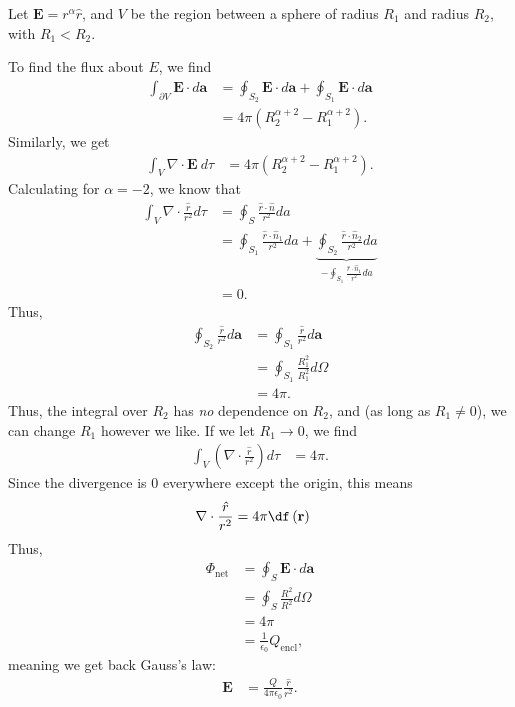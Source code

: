 \documentclass[10pt]{mypackage}
\begin{document}
\begin{example}
  Let $\mathbf{E} = r^{\alpha}\hat{r}$, and $V$ be the region between a sphere of radius $R_1$ and radius $R_2$, with $R_1 < R_2$.\newline

  To find the flux about $E$, we find
  \begin{align*}
    \int_{\partial V}^{} \mathbf{E}\cdot d\mathbf{a} &= \oint_{S_2}\mathbf{E}\cdot d\mathbf{a} + \oint_{S_1} \mathbf{E}\cdot d\mathbf{a}\\
                                            &= 4\pi \left(R_2^{\alpha + 2} - R_{1}^{\alpha + 2}\right).
  \end{align*}
  Similarly, we get
  \begin{align*}
    \int_{V}^{} \nabla \cdot \mathbf{E}\:d\tau &= 4\pi\left(R_2^{\alpha + 2} - R_1^{\alpha + 2}\right).
  \end{align*}
  Calculating for $\alpha = -2$, we know that
  \begin{align*}
    \int_{V}\nabla \cdot \frac{\hat{r}}{r^2}d\tau &= \oint_{S}\frac{\hat{r}\cdot \hat{n}}{r^2}da\\
                                                  &= \oint_{S_1}\frac{\hat{r}\cdot \hat{n}_1}{r^2}da + \underbrace{\oint_{S_2}\frac{\hat{r}\cdot \hat{n}_2}{r^2}da}_{-\oint_{S_1}\frac{\hat{r}\cdot \hat{n}_1}{r^2}da}\\
                                                  &= 0.
  \end{align*}
  Thus,
  \begin{align*}
    \oint_{S_2}\frac{\hat{r}}{r^2}d\mathbf{a} &= \oint_{S_1}\frac{\hat{r}}{r^2}d\mathbf{a}\\
                                              &= \oint_{S_1}\frac{R_1^{2}}{R_1^2}d\Omega\\
                                              &= 4\pi.
  \end{align*}
  Thus, the integral over $R_2$ has \textit{no} dependence on $R_2$, and (as long as $R_1\neq 0$), we can change $R_1$ however we like. If we let $R_1\rightarrow 0$, we find
  \begin{align*}
    \int_{V}\left(\nabla \cdot \frac{\hat{r}}{r^2}\right)d\tau &= 4\pi.
  \end{align*}
  Since the divergence is $0$ everywhere except the origin, this means
  \begin{align*}
    \nabla \cdot \frac{\hat{r}}{r^2} &= 4\pi \df\left(\mathbf{r}\right)
  \end{align*}
  Thus,
  \begin{align*}
    \Phi_{\text{net}} &= \oint_{S}\mathbf{E}\cdot d\mathbf{a}\\
                      &= \oint_{S}\frac{R^2}{R^2}d\Omega\\
                      &= 4\pi\\
                      &= \frac{1}{\epsilon_0}Q_{\text{encl}},
  \end{align*}
  meaning we get back Gauss's law:
  \begin{align*}
    \mathbf{E} &= \frac{Q}{4\pi\epsilon_0}\frac{\hat{r}}{r^2}.
  \end{align*}
\end{example}
\end{document}
